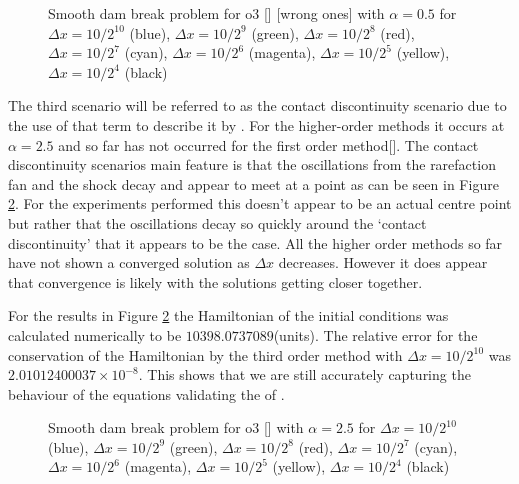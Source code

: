 \documentclass[SingleSpace,12pt,Proceedings]{Serre_ASCE}
\begin{document}
\begin{figure}
\centering
\caption{Smooth dam break problem for o3 [] [wrong ones] with $\alpha = 0.5$ for $\Delta x = 10/2^{10}$ (blue), $\Delta x = 10/2^9$ (green), $\Delta x = 10/2^8$ (red), $\Delta x = 10/2^7$ (cyan), $\Delta x = 10/2^6$ (magenta), $\Delta x = 10/2^5$ (yellow), $\Delta x = 10/2^{4}$ (black)}
\label{fig:o3a6dxlimflatexp}
\end{figure}

The third scenario will be referred to as the contact discontinuity scenario due to the use of that term to describe it by . For the higher-order methods it occurs at $\alpha = 2.5$ and so far has not occurred for the first order method[]. The contact discontinuity scenarios main feature is that the oscillations from the rarefaction fan and the shock decay and appear to meet at a point as can be seen in Figure \ref{fig:o3a9dxlimcdexp}. For the experiments performed this doesn't appear to be an actual centre point but rather that the oscillations decay so quickly around the `contact discontinuity' that it appears to be the case. All the higher order methods so far have not shown a converged solution as $\Delta x$ decreases. However it does appear that convergence is likely with the solutions getting closer together. 

For the results in Figure \ref{fig:o3a9dxlimcdexp} the Hamiltonian of the initial conditions was calculated numerically to be $10398.0737089$(units). The relative error for the conservation of the Hamiltonian by the third order method with $\Delta x = 10/2^{10}$ was $2.01012400037 \times 10^{-8}$. This shows that we are still accurately capturing the behaviour of the equations validating the of . 


\begin{figure}
\centering
{}
\caption{Smooth dam break problem for o3 [] with $\alpha = 2.5$ for $\Delta x = 10/2^{10}$ (blue), $\Delta x = 10/2^9$ (green), $\Delta x = 10/2^8$ (red), $\Delta x = 10/2^7$ (cyan), $\Delta x = 10/2^6$ (magenta), $\Delta x = 10/2^5$ (yellow), $\Delta x = 10/2^{4}$ (black)}
\label{fig:o3a9dxlimcdexp}
\end{figure}
\end{document}

